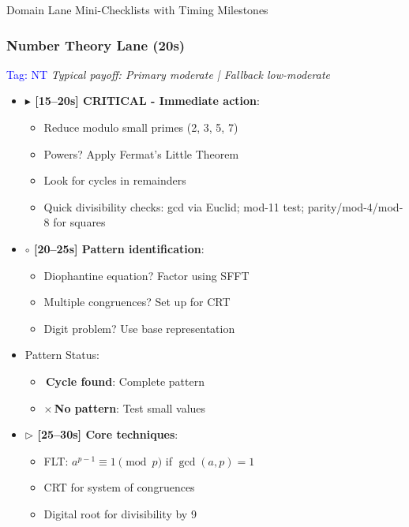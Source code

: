 \documentclass{article}
\begin{document}
\begin{classifybox}{Domain Lane Mini-Checklists with Timing Milestones}
     \subsubsection{Number Theory Lane (20s)}
     {\footnotesize\textcolor{timegreen}{}}\quad\textcolor{blue}{Tag: NT}
      \textit{Typical payoff: Primary moderate | Fallback low-moderate}
      \begin{itemize}[nosep]
      \item \textbf{$\blacktriangleright$ [15--20s] CRITICAL - Immediate action}:
        \begin{itemize}[nosep]
        \item Reduce modulo small primes (2, 3, 5, 7)
        \item Powers? Apply Fermat's Little Theorem
        \item Look for cycles in remainders
        \item Quick divisibility checks: gcd via Euclid; mod-11 test; parity/mod-4/mod-8 for squares
        \end{itemize}
      \item \textbf{$\circ$ [20--25s] Pattern identification}:
        \begin{itemize}[nosep]
        \item Diophantine equation? Factor using SFFT
        \item Multiple congruences? Set up for CRT
        \item Digit problem? Use base representation
        \end{itemize}
      \item {} Pattern Status:
        \begin{itemize}[nosep]
        \item \checkmark\,\textbf{Cycle found}: Complete pattern
        \item $\times$\,\textbf{No pattern}: Test small values
        \end{itemize}
      \item \textbf{$\triangleright$ [25--30s] Core techniques}:
        \begin{itemize}[nosep]
        \item FLT: $a^{p-1} \equiv 1 \pmod{p}$ if $\gcd(a,p)=1$
        \item CRT for system of congruences
        \item Digital root for divisibility by 9
        \end{itemize}

\end{itemize}
\end{classifybox}
\end{document}
